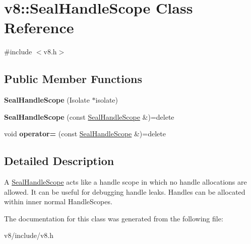 \hypertarget{classv8_1_1SealHandleScope}{}\section{v8\+:\+:Seal\+Handle\+Scope Class Reference}
\label{classv8_1_1SealHandleScope}


{\ttfamily \#include $<$v8.\+h$>$}

\subsection*{Public Member Functions}
\begin{DoxyCompactItemize}
\item 
\mbox{\label{classv8_1_1SealHandleScope_acfdab75cc53b53d3ba1a50ab5f4fe16e}} 
{\bfseries Seal\+Handle\+Scope} (Isolate $\ast$isolate)
\item 
\mbox{\label{classv8_1_1SealHandleScope_a5e1f6e49a9aa67bb570437fa98097e75}} 
{\bfseries Seal\+Handle\+Scope} (const \mbox{\hyperlink{classv8_1_1SealHandleScope}{Seal\+Handle\+Scope}} \&)=delete
\item 
\mbox{\label{classv8_1_1SealHandleScope_a61b69e50f3996e315c4d3f41c1f67956}} 
void {\bfseries operator=} (const \mbox{\hyperlink{classv8_1_1SealHandleScope}{Seal\+Handle\+Scope}} \&)=delete
\end{DoxyCompactItemize}


\subsection{Detailed Description}
A \mbox{\hyperlink{classv8_1_1SealHandleScope}{Seal\+Handle\+Scope}} acts like a handle scope in which no handle allocations are allowed. It can be useful for debugging handle leaks. Handles can be allocated within inner normal Handle\+Scopes. 

The documentation for this class was generated from the following file\+:\begin{DoxyCompactItemize}
\item 
v8/include/v8.\+h\end{DoxyCompactItemize}

